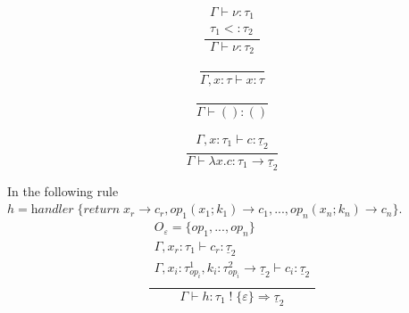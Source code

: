 \documentclass[12pt]{article}
\newcommand\eff[0]{\varepsilon}
\newcommand\Op[0]{O}
\newcommand\op[0]{op}
\newcommand\pty[1]{\ty^1_{#1}}
\newcommand\rty[1]{\ty^2_{#1}}
\newcommand\ty[0]{\tau}
\newcommand\tunit[0]{()}
\newcommand\tarr[2]{#1 \rightarrow #2}
\newcommand\thandler[2]{#1 \Rightarrow #2}
\newcommand\cty[0]{\underline{\ty}}
\newcommand\aty[2]{#1 \; ! \; #2}
\newcommand\val[0]{\nu}
\newcommand\vunit[0]{()}
\newcommand\vabs[2]{\lambda #1 . #2}
\newcommand\vhandler[1]{\textit{handler} \; \{#1\}}
\newcommand\comp[0]{c}
\newcommand\subty[2]{#1 <: #2}
\begin{document}
\begin{minipage}{0.25\textwidth}
\[\frac{
	\begin{array}{l}
	\Gamma \vdash \val : \ty_1 \\
	\subty{\ty_1}{\ty_2}
	\end{array}
}{
	\Gamma \vdash \val : \ty_2
}\]
\end{minipage}
\begin{minipage}{0.25\textwidth}
\[\frac{
}{
	\Gamma, x : \ty \vdash x : \ty
}\]
\end{minipage}
\begin{minipage}{0.25\textwidth}
\[\frac{
}{
	\Gamma \vdash \vunit : \tunit
}\]
\end{minipage}
\begin{minipage}{0.25\textwidth}
\[\frac{
	\begin{array}{l}
	\Gamma, x : \ty_1 \vdash \comp : \cty_2
	\end{array}
}{
	\Gamma \vdash \vabs{x}{\comp} : \tarr{\ty_1}{\cty_2}
}\]
\end{minipage}

\vspace{10pt}
In the following rule \\$h = 
	\vhandler{
		\textit{return} \; x_r \rightarrow \comp_r,
		\op_1(x_1 ; k_1) \rightarrow \comp_1,
		...,
		\op_n(x_n ; k_n) \rightarrow \comp_n
	}$.
\[\frac{
	\begin{array}{l}
	\Op_\eff = \{ op_1, ..., op_n \} \\
	\Gamma, x_r : \ty_1 \vdash \comp_r : \cty_2 \\
	\Gamma, x_i : \pty{\op_i}, k_i : \tarr{\rty{\op_i}}{\cty_2} \vdash \comp_i : \cty_2 \\
	\end{array}
}{
	\Gamma \vdash h :
	\thandler{\aty{\ty_1}{\{\eff\}}}{\cty_2}
}\]

\end{document}
